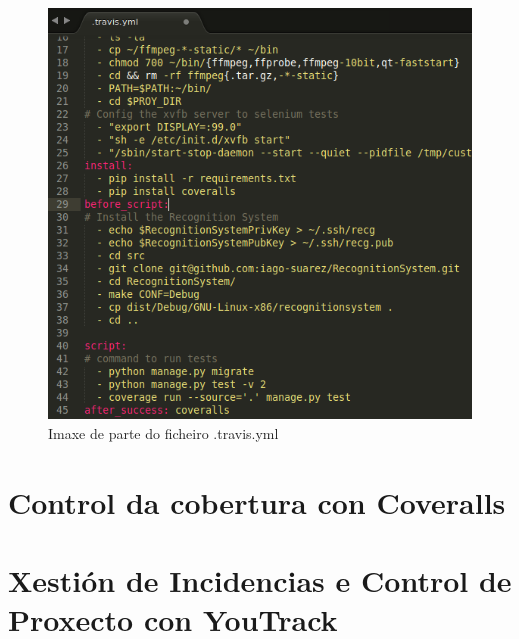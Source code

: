     \begin{figure}[htp]
    \begin{center}
        \includegraphics[scale=0.6]{figures/travisYml.png}
        \caption{Imaxe de parte do ficheiro .travis.yml}
    \label{fig:travisYml}
    \end{center}
    \end{figure}
    
    
\section{Control da cobertura con Coveralls}
\section{Xestión de Incidencias e Control de Proxecto con YouTrack}
